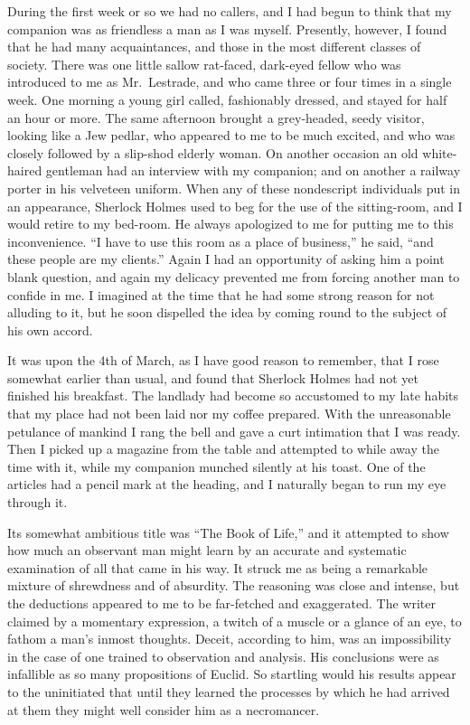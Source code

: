 \documentclass[12pt,english,oneside]{book}
\begin{document}
During the first week or so we had no callers, and I had begun to
think that my companion was as friendless a man as I was myself. Presently,
however, I found that he had many acquaintances, and those in the
most different classes of society. There was one little sallow rat-faced,
dark-eyed fellow who was introduced to me as Mr.\ Lestrade, and who
came three or four times in a single week. One morning a young girl
called, fashionably dressed, and stayed for half an hour or more.
The same afternoon brought a grey-headed, seedy visitor, looking like
a Jew pedlar, who appeared to me to be much excited, and who was closely
followed by a slip-shod elderly woman. On another occasion an old
white-haired gentleman had an interview with my companion; and on
another a railway porter in his velveteen uniform. When any of these
nondescript individuals put in an appearance, Sherlock Holmes used
to beg for the use of the sitting-room, and I would retire to my bed-room.
He always apologized to me for putting me to this inconvenience. {}``I
have to use this room as a place of business,'' he said, {}``and
these people are my clients.'' Again I had an opportunity of asking
him a point blank question, and again my delicacy prevented me from
forcing another man to confide in me. I imagined at the time that
he had some strong reason for not alluding to it, but he soon dispelled
the idea by coming round to the subject of his own accord.

It was upon the 4th of March, as I have good reason to remember, that
I rose somewhat earlier than usual, and found that Sherlock Holmes
had not yet finished his breakfast. The landlady had become so accustomed
to my late habits that my place had not been laid nor my coffee prepared.
With the unreasonable petulance of mankind I rang the bell and gave
a curt intimation that I was ready. Then I picked up a magazine from
the table and attempted to while away the time with it, while my companion
munched silently at his toast. One of the articles had a pencil mark
at the heading, and I naturally began to run my eye through it.

Its somewhat ambitious title was {}``The Book of Life,'' and it
attempted to show how much an observant man might learn by an accurate
and systematic examination of all that came in his way. It struck
me as being a remarkable mixture of shrewdness and of absurdity. The
reasoning was close and intense, but the deductions appeared to me
to be far-fetched and exaggerated. The writer claimed by a momentary
expression, a twitch of a muscle or a glance of an eye, to fathom
a man's inmost thoughts. Deceit, according to him, was an impossibility
in the case of one trained to observation and analysis. His conclusions
were as infallible as so many propositions of Euclid. So startling
would his results appear to the uninitiated that until they learned
the processes by which he had arrived at them they might well consider
him as a necromancer.
\end{document}
